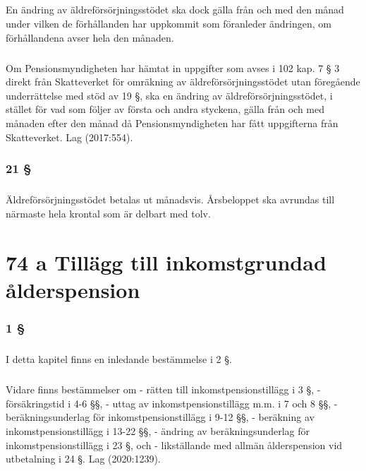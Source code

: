\documentclass[a4paper,notitlepage,openany,10pt]{book}
\begin{document}
\paragraph*{}
En ändring av äldreförsörjningsstödet ska dock gälla från och med den månad under vilken de förhållanden har uppkommit som föranleder ändringen, om förhållandena avser hela den månaden.
\paragraph*{}
Om Pensionsmyndigheten har hämtat in uppgifter som avses i 102 kap. 7 § 3 direkt från Skatteverket för omräkning av äldreförsörjningsstödet utan föregående underrättelse med stöd av 19 §, ska en ändring av äldreförsörjningsstödet, i stället för vad som följer av första och andra styckena, gälla från och med månaden efter den månad då Pensionsmyndigheten har fått uppgifterna från Skatteverket.
Lag (2017:554).
\subsection*{21 §}
\paragraph*{}
Äldreförsörjningsstödet betalas ut månadsvis.
Årsbeloppet ska avrundas till närmaste hela krontal som är delbart med tolv.
\chapter*{74 a Tillägg till inkomstgrundad ålderspension}
\subsection*{1 §}
\paragraph*{}
I detta kapitel finns en inledande bestämmelse i 2 §.
\paragraph*{}
Vidare finns bestämmelser om
\newline - rätten till inkomstpensionstillägg i 3 §,
\newline - försäkringstid i 4-6 §§,
\newline - uttag av inkomstpensionstillägg m.m. i 7 och 8 §§,
\newline - beräkningsunderlag för inkomstpensionstillägg i 9-12 §§,
\newline - beräkning av inkomstpensionstillägg i 13-22 §§,
\newline - ändring av beräkningsunderlag för inkomstpensionstillägg i 23 §, och
\newline - likställande med allmän ålderspension vid utbetalning i 24 §.
Lag (2020:1239).
\end{document}
